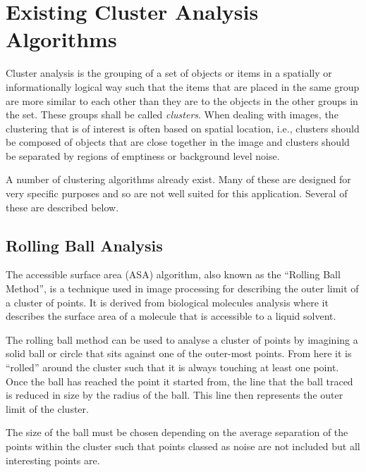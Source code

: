 
\chapter{Existing Cluster Analysis Algorithms}
\label{prt:existing_cluster_analysis_algorithms}

Cluster analysis is the grouping of a set of objects or items in a spatially or
informationally logical way such that the items that are placed in the same
group are more similar to each other than they are to the objects in the other
groups in the set. These groups shall be called \emph{clusters}. When dealing
with images, the clustering that is of interest is often based on spatial
location, i.e., clusters should be composed of objects that are close together
in the image and clusters should be separated by regions of emptiness or
background level noise.

A number of clustering algorithms already exist. Many of these are designed for
very specific purposes and so are not well suited for this application. Several
of these are described below.

\section{Rolling Ball Analysis}
\label{sub:rolling_ball_analysis}

The accessible surface area (ASA) algorithm, also known as the ``Rolling Ball
Method'', is a technique used in image processing for describing the outer
limit of a cluster of points. It is derived from biological molecules analysis
where it describes the surface area of a molecule that is accessible to a
liquid solvent.

The rolling ball method can be used to analyse a cluster of points by imagining
a solid ball or circle that sits against one of the outer-most points. From
here it is ``rolled'' around the cluster such that it is always touching at
least one point. Once the ball has reached the point it started from, the line
that the ball traced is reduced in size by the radius of the ball. This line
then represents the outer limit of the cluster.

The size of the ball must be chosen depending on the average separation of the
points within the cluster such that points classed as noise are not included
but all interesting points are.

